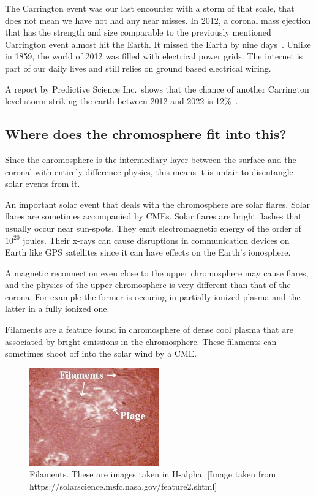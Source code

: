 \documentclass[12pt,upcase]{umlthesis}
\begin{document}
The Carrington event was our last encounter with a storm of that scale, that does not mean we have not had any near misses. In 2012, a coronal mass ejection that has the strength and size comparable to the previously mentioned Carrington event almost hit the Earth. It missed the Earth by nine days~\citep{Baker2013}. Unlike in 1859, the world of 2012 was filled with electrical power grids. The internet is part of our daily lives and still relies on ground based electrical wiring.

A report by Predictive Science Inc.\ shows that the chance of another Carrington level storm striking the earth between 2012 and 2022 is 12\%~\citep{riley2012}.

\subsection{Where does the chromosphere fit into this?}

Since the chromosphere is the intermediary layer between the surface and the coronal with entirely difference physics, this means it is unfair to disentangle solar events from it.

An important solar event that deals with the chromosphere are solar flares. Solar flares are sometimes accompanied by CMEs. Solar flares are bright flashes that usually occur near sun-spots. They emit electromagnetic energy of the order of $10^{20}$ joules. Their x-rays can cause disruptions in communication devices on Earth like GPS satellites since it can have effects on the Earth's ionosphere.

A magnetic reconnection even close to the upper chromosphere may cause flares, and the physics of the upper chromosphere is very different than that of the corona. For example the former is occuring in partially ionized plasma and the latter in a fully ionized one.

Filaments are a feature found in chromosphere of dense cool plasma that are associated by bright emissions in the chromosphere. These filaments can sometimes shoot off into the solar wind by a CME\@.

\begin{figure}[ht!]
	\centering
	\includegraphics[width=0.5\textwidth]{images/filament.jpg}
	\caption{Filaments. These are images taken in H-alpha. [Image taken from https://solarscience.msfc.nasa.gov/feature2.shtml]}\label{fig:filament} %
\end{figure}
\end{document}
